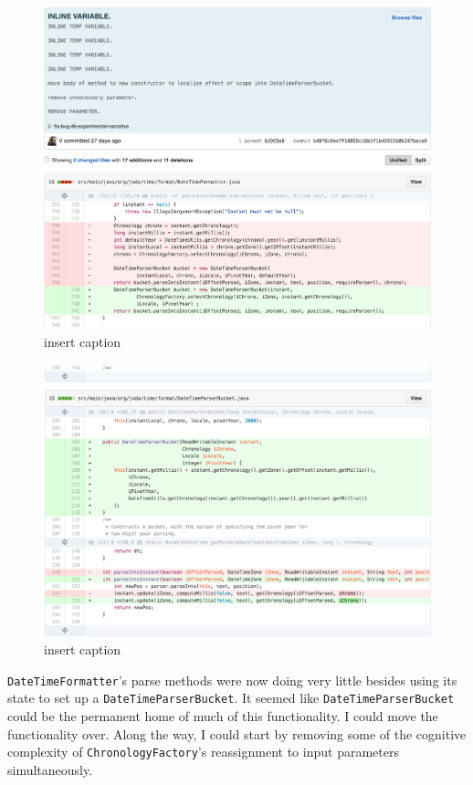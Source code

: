 \begin{figure}[H]
	\centering
	\includegraphics[width=\linewidth]{code56}
	\caption{insert caption}
\end{figure}
\begin{figure}[H]
	\centering
	\includegraphics[width=\linewidth]{code57}
	\caption{insert caption}
\end{figure}

\texttt{DateTimeFormatter}’s parse methods were now doing very little besides using its state to set up a \texttt{DateTimeParserBucket}. It seemed like \texttt{DateTimeParserBucket} could be the permanent home of much of this functionality. I could move the functionality over. Along the way, I could start by removing some of the cognitive complexity of \texttt{ChronologyFactory}’s reassignment to input parameters simultaneously.

